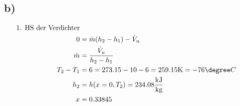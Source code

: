 

\subsection*{b)}

\begin{align*}
    \text{1. HS der Verdichter} \\
    0 &= \dot{m} (h_2 - h_1) - \dot{V}_u \\
    \dot{m} &= \frac{\dot{V}_u}{h_2 - h_1} \\
    T_2 - T_1 &= 6 = 273.15 - 10 - 6 = 259.15 \text{K} = -76 \degree C \\
    h_2 &= h(x=0, T_2) = 234.08 \frac{\text{kJ}}{\text{kg}} \\
    x &= 0.33845
\end{align*}